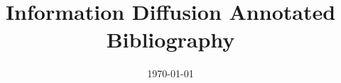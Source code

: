 \documentclass[12pt]{article}
\begin{document}
\title{Information Diffusion Annotated Bibliography}
\date{\today}
\maketitle

\nocite{*}



\end{document}
